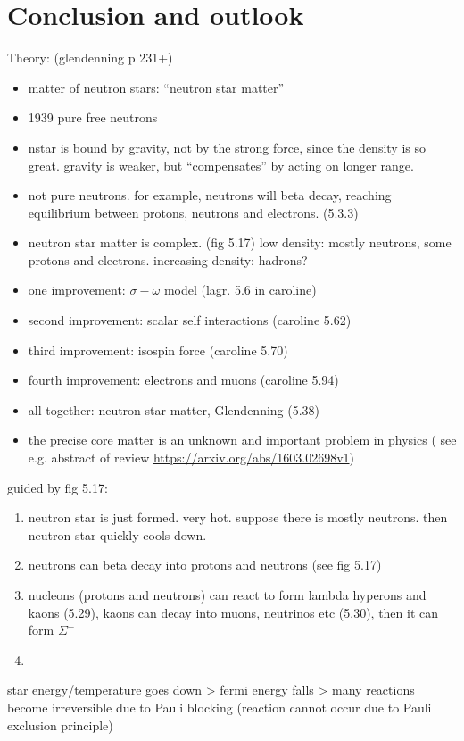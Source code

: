 \chapter{Conclusion and outlook}
\label{chap:conclusion}

Theory: (glendenning p 231+)
\begin{itemize}
\item matter of neutron stars: ``neutron star matter''
\item 1939 pure free neutrons
\item nstar is bound by gravity, not by the strong force, since the density is so great. gravity is weaker, but ``compensates'' by acting on longer range.
\item not pure neutrons. for example, neutrons will beta decay, reaching equilibrium between protons, neutrons and electrons. (5.3.3)
\item neutron star matter is complex. (fig 5.17) low density: mostly neutrons, some protons and electrons. increasing density: hadrons?
\item one improvement: $\sigma-\omega$ model (lagr. 5.6 in caroline)
\item second improvement: scalar self interactions (caroline 5.62)
\item third improvement: isospin force (caroline 5.70)
\item fourth improvement: electrons and muons (caroline 5.94)
\item all together: neutron star matter, Glendenning (5.38)
\item the precise core matter is an unknown and important problem in physics ( see e.g. abstract of review \url{https://arxiv.org/abs/1603.02698v1})
\end{itemize}

guided by fig 5.17:
\begin{enumerate}
\item neutron star is just formed. very hot. suppose there is mostly neutrons. then neutron star quickly cools down.
\item neutrons can beta decay into protons and neutrons (see fig 5.17)
\item nucleons (protons and neutrons) can react to form lambda hyperons and kaons (5.29), kaons can decay into muons, neutrinos etc (5.30), then it can form $\Sigma^-$
\item 
\end{enumerate}
star energy/temperature goes down > fermi energy falls > many reactions become irreversible due to Pauli blocking (reaction cannot occur due to Pauli exclusion principle)
